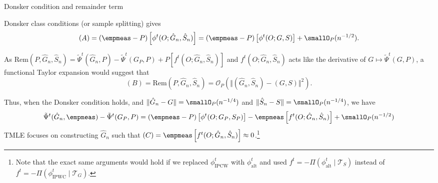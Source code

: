 \documentclass[smaller]{beamer}\usepackage{listings}
\begin{document}
\begin{frame}[label={sec:org183284f}]{Donsker condition and remainder term}
\small

Donsker class conditions (or sample splitting) gives
\begin{equation*}
 (A) = (\empmeas-P) \left[ \phi^t(O; \hat{G}_n, \hat{S}_n) \right]
  = (\empmeas-P) \left[ \phi^t(O ; G, S) \right] + \smallO_P(n^{-1/2}).
\end{equation*}

 \vfill \pause

As $\mathrm{Rem}(P, \hat{G}_n, \hat{S}_n) = \tilde{\Psi}^t(\hat{G}_n, P) - \tilde{\Psi}^t(G_P, P) +
P[f^t(O; \hat{G}_n, \hat{S}_n)]$ and $f^t(O; \hat{G}_n, \hat{S}_n)$ acts like the derivative of $G
\mapsto \tilde{\Psi}^t(G, P)$, a functional Taylor expansion would suggest that
\begin{equation*}
  (B) = \mathrm{Rem}(P, \hat{G}_n, \hat{S}_n) = \mathcal{O}_P
  \left(
    \Vert (\hat G_n, \hat S_n) - ( G,  S) \Vert^2
  \right).
\end{equation*}

\vfill \pause   
Thus, when the Donsker condition holds, and $\Vert\hat{G}_n- G\Vert = \smallO_P(n^{-1/4})$ and
$\Vert\hat{S}_n- S\Vert = \smallO_P(n^{-1/4})$, we have
\begin{equation*}
  \tilde{\Psi}^t(\hat G_n, \empmeas) - \tilde{\Psi}^t(G_P, P)
  =  (\empmeas-P)
  \left[
    \phi^t(O; G_P, S_P)
  \right] 
  - \empmeas
  \left[
    f^t(O; \hat{G}_n, \hat{S}_n)
  \right] + \smallO_P(n^{-1/2})
\end{equation*}
\pause TMLE focuses on constructing $\hat{G}_n$ such that
$ (C) = \empmeas \left[ f^t(O; \hat{G}_n, \hat{S}_n) \right] \approx 0$.\footnote<5->{Note that the exact same
  arguments would hold if we replaced $\phi^t_{\mathrm{IPCW}}$ with $\phi^t_{\mathrm{alt}}$ and used
  $f^t=-\Pi(\phi^t_{\mathrm{alt}} \mid \mathcal{T}_S)$ instead of
  $f^t=-\Pi(\phi^t_{\mathrm{IPWC}} \mid \mathcal{T}_G)$.}   
\end{frame}
\end{document}
